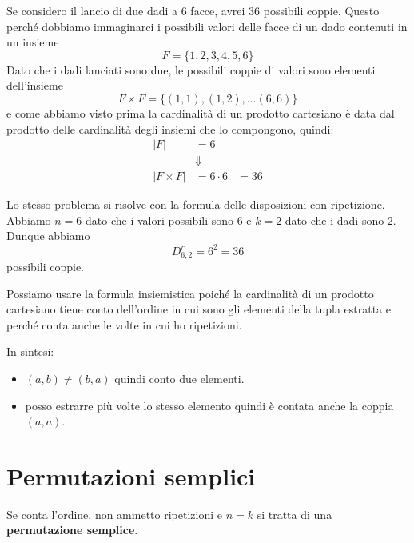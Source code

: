\begin{example}
	Se considero il lancio di due dadi a 6 facce, avrei 36 possibili coppie. Questo perch\'e
	dobbiamo immaginarci i possibili valori delle facce di un dado contenuti in un insieme
	\begin{equation*}
		F = \{ 1, 2, 3, 4, 5, 6 \}
	\end{equation*}
	Dato che i dadi lanciati sono due, le possibili coppie di valori sono elementi dell'insieme
	\begin{equation*}
		F \times F = \{ (1, 1), (1, 2), \dots (6, 6) \}
	\end{equation*}
	e come abbiamo visto prima la cardinalit\`a di un prodotto cartesiano \`e data dal prodotto
	delle cardinalit\`a degli insiemi che lo compongono, quindi:
	\begin{equation*}
		\begin{array}{lll}
			|F|          & = 6                \\
			             & \Downarrow         \\
			|F \times F| & = 6 \cdot 6 & = 36
		\end{array}
	\end{equation*}

	Lo stesso problema si risolve con la formula delle disposizioni con ripetizione. Abbiamo
	$n = 6$ dato che i valori possibili sono 6 e $k = 2$ dato che i dadi sono 2. Dunque abbiamo
	\begin{equation*}
		D_{6, 2}^r = 6^2 = 36
	\end{equation*}
	possibili coppie.
\end{example}

\begin{observation}
	Possiamo usare la formula insiemistica poich\'e la cardinalit\`a di un prodotto cartesiano
	tiene conto dell'ordine in cui sono gli elementi della tupla estratta e perch\'e conta
	anche le volte in cui ho ripetizioni.

	In sintesi:
	\begin{itemize}
		\item $(a, b) \neq (b, a)$ quindi conto due elementi.
		\item posso estrarre pi\`u volte lo stesso elemento quindi \`e contata anche la
		      coppia $(a, a)$.
	\end{itemize}

\end{observation}


\section{Permutazioni semplici}
\begin{defn}
	Se conta l'ordine, non ammetto ripetizioni e $n = k$ si tratta di una
	\textbf{permutazione semplice}.
\end{defn}

